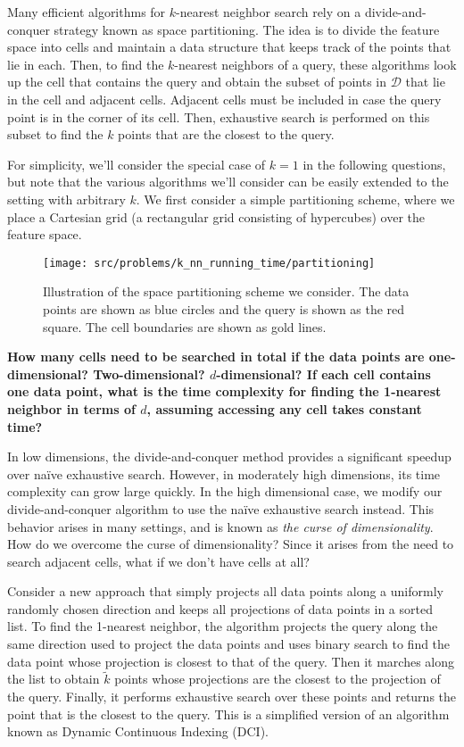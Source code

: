 \documentclass[preview]{standalone}
\begin{document}
\begin{Parts}
Many efficient algorithms for $k$-nearest neighbor search rely on a divide-and-conquer strategy known as space partitioning. The idea is to divide the feature space into cells and maintain a data structure that keeps track of the points that lie in each. Then, to find the $k$-nearest neighbors of a query, these algorithms look up the cell that contains the query and obtain the subset of points in $\mathcal{D}$ that lie in the cell and adjacent cells. Adjacent cells must be included in case the query point is in the corner of its cell. Then, exhaustive search is performed on this subset to find the $k$ points that are the closest to the query.

For simplicity, we'll consider the special case of $k = 1$ in the following questions, but note that the various algorithms we'll consider can be easily extended to the setting with arbitrary $k$. We first consider a simple partitioning scheme, where we place a Cartesian grid (a rectangular grid consisting of hypercubes) over the feature space.

\begin{figure}[h]
    \centering
    \texttt{[image: src/problems/k\_nn\_running\_time/partitioning]}
    \caption{Illustration of the space partitioning scheme we consider. The data points are shown as blue circles and the query is shown as the red square. The cell boundaries are shown as gold lines.}
\end{figure}


{\bf How many cells need to be searched in total if the data points are one-dimensional? Two-dimensional? $d$-dimensional? If each cell contains one data point, what is the time complexity for finding the 1-nearest neighbor in terms of $d$, assuming accessing any cell takes constant time?}



\Part In low dimensions, the divide-and-conquer method provides a significant speedup over na\"{i}ve exhaustive search. However, in moderately high dimensions, its time complexity can grow large quickly. In the high dimensional case, we modify our divide-and-conquer algorithm to use the na\"{i}ve exhaustive search instead. 
This behavior arises in many settings, and is known as \emph{the curse of dimensionality}.
How do we overcome the curse of dimensionality? Since it arises from the need to search adjacent cells, what if we don't have cells at all?

Consider a new approach that simply projects all data points along a uniformly randomly chosen direction and keeps all projections of data points in a sorted list. To find the 1-nearest neighbor, the algorithm projects the query along the same direction used to project the data points and uses binary search to find the data point whose projection is closest to that of the query. Then it marches along the list to obtain $\tilde{k}$ points whose projections are the closest to the projection of the query. Finally, it performs exhaustive search over these points and returns the point that is the closest to the query. This is a simplified version of an algorithm known as Dynamic Continuous Indexing (DCI).


\end{Parts}
\end{document}
